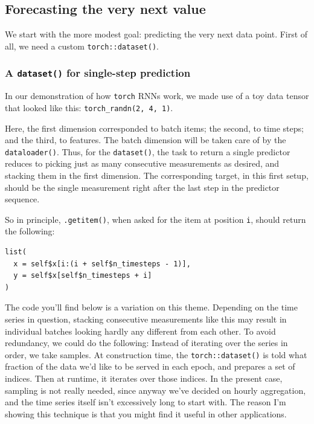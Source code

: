 \documentclass[
  letterpaper,
]{krantz}
\begin{document}
\hypertarget{forecasting-the-very-next-value}{%
\subsection{Forecasting the very next
value}\label{forecasting-the-very-next-value}}

We start with the more modest goal: predicting the very next data point.
First of all, we need a custom \texttt{torch::dataset()}.

\hypertarget{a-dataset-for-single-step-prediction}{%
\subsubsection{\texorpdfstring{A \texttt{dataset()} for single-step
prediction}{A dataset() for single-step prediction}}\label{a-dataset-for-single-step-prediction}}

In our demonstration of how \texttt{torch} RNNs work, we made use of a
toy data tensor that looked like this: \texttt{torch\_randn(2,\ 4,\ 1)}.

Here, the first dimension corresponded to batch items; the second, to
time steps; and the third, to features. The batch dimension will be
taken care of by the \texttt{dataloader()}. Thus, for the
\texttt{dataset()}, the task to return a single predictor reduces to
picking just as many consecutive measurements as desired, and stacking
them in the first dimension. The corresponding target, in this first
setup, should be the single measurement right after the last step in the
predictor sequence.

So in principle, \texttt{.getitem()}, when asked for the item at
position \texttt{i}, should return the following:

\begin{verbatim}
list(
  x = self$x[i:(i + self$n_timesteps - 1)],
  y = self$x[self$n_timesteps + i]
)
\end{verbatim}

The code you'll find below is a variation on this theme. Depending on
the time series in question, stacking consecutive measurements like this
may result in individual batches looking hardly any different from each
other. To avoid redundancy, we could do the following: Instead of
iterating over the series in order, we take samples. At construction
time, the \texttt{torch::dataset()} is told what fraction of the data
we'd like to be served in each epoch, and prepares a set of indices.
Then at runtime, it iterates over those indices. In the present case,
sampling is not really needed, since anyway we've decided on hourly
aggregation, and the time series itself isn't excessively long to start
with. The reason I'm showing this technique is that you might find it
useful in other applications.
\end{document}
